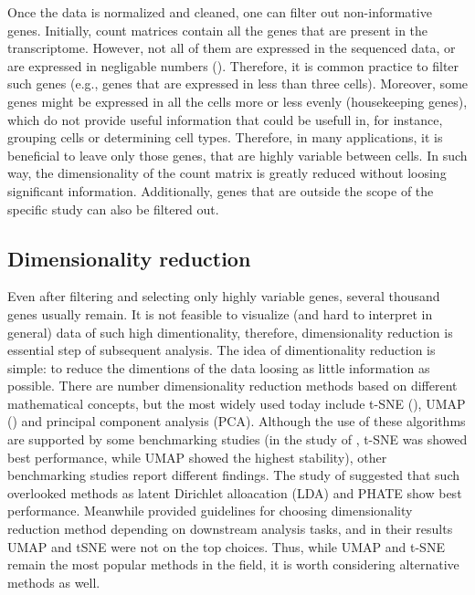 Once the data is normalized and cleaned, one can filter out non-informative genes.
Initially, count matrices contain all the genes that are present in the transcriptome.
However, not all of them are expressed in the sequenced data, or are expressed in negligable numbers (\cite{Heumos2023}).
Therefore, it is common practice to filter such genes (e.g., genes that are expressed in less than three cells).
Moreover, some genes might be expressed in all the cells more or less evenly (housekeeping genes),
which do not provide useful information that could be usefull in, for instance, grouping cells or determining cell types.
Therefore, in many applications, it is beneficial to leave only those genes, that are highly variable between cells.
In such way, the dimensionality of the count matrix is greatly reduced without loosing significant information.
Additionally, genes that are outside the scope of the specific study can also be filtered out.

\subsection{Dimensionality reduction}
\label{sec:dimReduction}

Even after filtering and selecting only highly variable genes, several thousand genes usually remain.
It is not feasible to visualize (and hard to interpret in general) data of such high dimentionality, therefore,
dimensionality reduction is essential step of subsequent analysis.
The idea of dimentionality reduction is simple:
to reduce the dimentions of the data loosing as little information as possible.
There are number dimensionality reduction methods based on different mathematical concepts,
but the most widely used today include
t-SNE (\cite{Hinton2002}), UMAP (\cite{McInnes2018}) and principal component analysis (PCA).
Although the use of these algorithms are supported by some benchmarking studies
(in the study of \textcite{Xiang2021}, t-SNE was showed best performance, while UMAP showed the highest stability),
other benchmarking studies report different findings.
The study of \textcite{Koch2021} suggested that such overlooked methods as
latent Dirichlet alloacation (LDA) and PHATE show best performance.
Meanwhile \textcite{Sun2019} provided guidelines for choosing dimensionality reduction method
depending on downstream analysis tasks, and in their results UMAP and tSNE were not on the top choices.
Thus, while UMAP and t-SNE remain the most popular methods in the field,
it is worth considering alternative methods as well.

